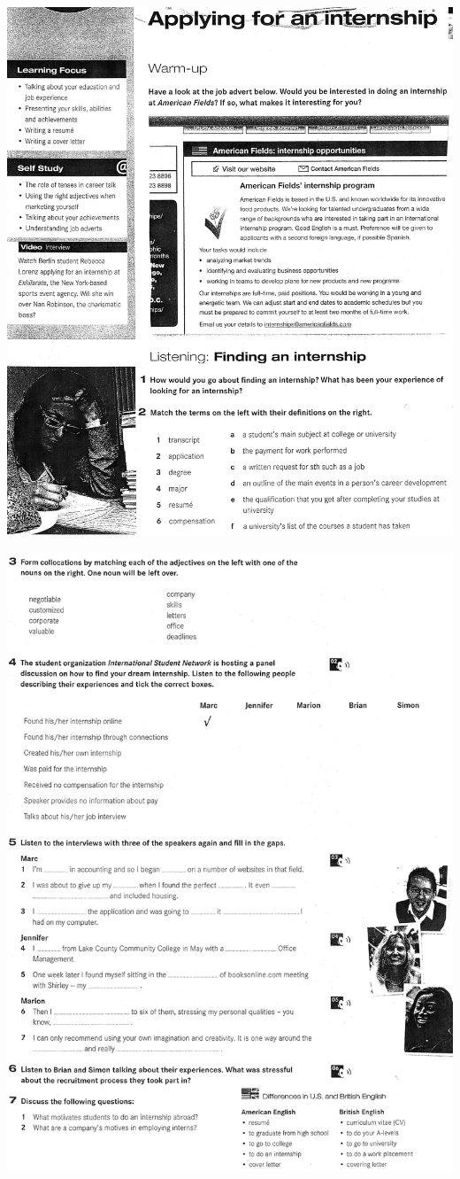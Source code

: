 \includegraphics[scale=.85]{handouts/Eng401.jpg}

\includegraphics[scale=.85]{handouts/Eng402.jpg}

